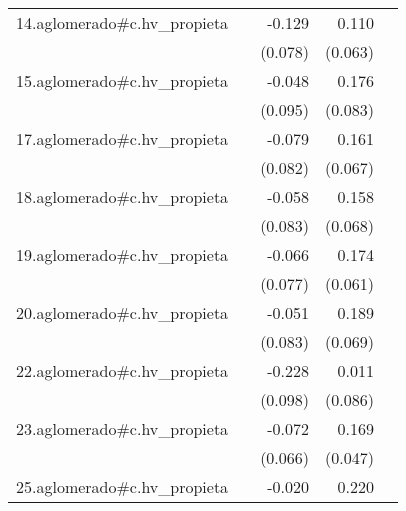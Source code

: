 {\begin{longtable}{l*{4}{D{.}{.}{-1}}}
\addlinespace
14.aglomerado#c.hv\_propieta&                     &      -0.129         &       0.110         &                     \\
            &                     &     (0.078)         &     (0.063)         &                     \\
\addlinespace
15.aglomerado#c.hv\_propieta&                     &      -0.048         &       0.176\sym{*}  &                     \\
            &                     &     (0.095)         &     (0.083)         &                     \\
\addlinespace
17.aglomerado#c.hv\_propieta&                     &      -0.079         &       0.161\sym{*}  &                     \\
            &                     &     (0.082)         &     (0.067)         &                     \\
\addlinespace
18.aglomerado#c.hv\_propieta&                     &      -0.058         &       0.158\sym{*}  &                     \\
            &                     &     (0.083)         &     (0.068)         &                     \\
\addlinespace
19.aglomerado#c.hv\_propieta&                     &      -0.066         &       0.174\sym{**} &                     \\
            &                     &     (0.077)         &     (0.061)         &                     \\
\addlinespace
20.aglomerado#c.hv\_propieta&                     &      -0.051         &       0.189\sym{**} &                     \\
            &                     &     (0.083)         &     (0.069)         &                     \\
\addlinespace
22.aglomerado#c.hv\_propieta&                     &      -0.228\sym{*}  &       0.011         &                     \\
            &                     &     (0.098)         &     (0.086)         &                     \\
\addlinespace
23.aglomerado#c.hv\_propieta&                     &      -0.072         &       0.169\sym{***}&                     \\
            &                     &     (0.066)         &     (0.047)         &                     \\
\addlinespace
25.aglomerado#c.hv\_propieta&                     &      -0.020         &       0.220\sym{**} &                     \\

\end{longtable}}
